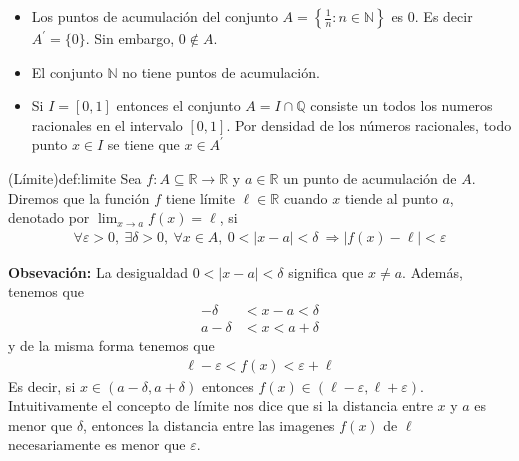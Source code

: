 \documentclass[12pt]{book}
\begin{document}
\begin{eje}{}{}
    \begin{itemize}


        
        \item  Los puntos de acumulación del conjunto $A=\left\{ \displaystyle \frac{1}{n}: n \in \mathbb{N} \right\}$ es 0. Es decir $A^{\prime}=\{0\}$. Sin embargo, $0 \notin A$.

        \item El conjunto $\mathbb{N}$ no tiene puntos de acumulación.

        \item Si $I=[0,1]$ entonces el conjunto $A=I\cap \mathbb{Q}$ consiste un todos los numeros racionales en el intervalo $[0,1]$. Por densidad de los números racionales, todo punto $x \in I$ se tiene que $x \in A^{\prime}$
    \end{itemize}
\end{eje}

\begin{defi}{(Límite)}{def:limite}
Sea $f : A \subseteq \mathbb{R} \longrightarrow \mathbb{R}$ y $a \in \mathbb{R}$ un punto de acumulación de $A$. Diremos que la función $f$ tiene límite $\ell \in \mathbb{R}$ cuando $x$ tiende al punto $a$, denotado por $\displaystyle \lim_{x \to a}f(x) = \ell$, si 
\begin{align*}
    \forall \varepsilon>0, \ \exists \delta >0,  \ \forall x \in A,  \ 0 < |x-a| < \delta \ \Longrightarrow | f(x)-\ell| < \varepsilon
\end{align*}
\end{defi}

\textbf{Obsevación:} La desigualdad $0< |x-a| < \delta$ significa que $x\neq a$. Además, tenemos que 
\begin{align*}
    -\delta &< x-a < \delta \\
    a-\delta &< x < a+ \delta \end{align*}
y de la misma forma tenemos que 
\begin{align*}
    \ell - \varepsilon < f(x) < \varepsilon + \ell 
\end{align*}
Es decir, si  $x \in (a-\delta ,a + \delta  )$ entonces $f(x) \in (\ell - \varepsilon, \ell + \varepsilon)$. Intuitivamente el concepto de límite nos dice que si la distancia entre $x$ y $a$ es menor que $\delta$, entonces la distancia entre las imagenes $f(x)$ de $\ell$ necesariamente es menor que $\varepsilon$.
\end{document}
